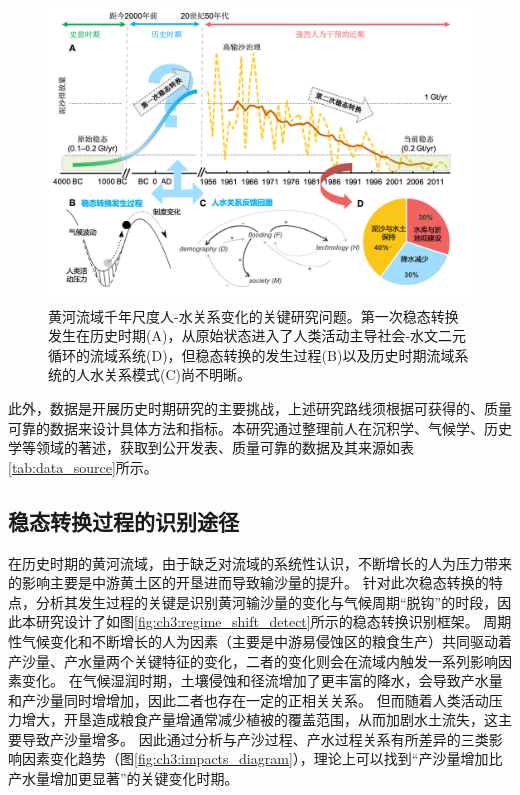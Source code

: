 \begin{figure}[!htb] %
    \centering
    \includegraphics[width=\textwidth]{img/ch3/ch3_why_regime_shift.png}
    \caption[黄河流域千年尺度人-水关系变化的关键研究问题]{黄河流域千年尺度人-水关系变化的关键研究问题。第一次稳态转换发生在历史时期(A)，从原始状态进入了人类活动主导社会-水文二元循环的流域系统(D)，但稳态转换的发生过程(B)以及历史时期流域系统的人水关系模式(C)尚不明晰。}
    \label{fig:ch3:why_regime_shift}
\end{figure}

此外，数据是开展历史时期研究的主要挑战，上述研究路线须根据可获得的、质量可靠的数据来设计具体方法和指标。本研究通过整理前人在沉积学、气候学、历史学等领域的著述，获取到公开发表、质量可靠的数据及其来源如表\ref{tab:data_source}所示。




\subsection{稳态转换过程的识别途径}
\label{sec:ch3:approach}

在历史时期的黄河流域，由于缺乏对流域的系统性认识，不断增长的人为压力带来的影响主要是中游黄土区的开垦进而导致输沙量的提升\cite{wu2020a}。
针对此次稳态转换的特点，分析其发生过程的关键是识别黄河输沙量的变化与气候周期“脱钩”的时段，因此本研究设计了如图\ref{fig:ch3:regime_shift_detect}所示的稳态转换识别框架。
周期性气候变化和不断增长的人为因素（主要是中游易侵蚀区的粮食生产）共同驱动着产沙量、产水量两个关键特征的变化，二者的变化则会在流域内触发一系列影响因素变化。
在气候湿润时期，土壤侵蚀和径流增加了更丰富的降水，会导致产水量和产沙量同时增增加，因此二者也存在一定的正相关关系。
但而随着人类活动压力增大，开垦造成粮食产量增通常减少植被的覆盖范围，从而加剧水土流失，这主要导致产沙量增多。
因此通过分析与产沙过程、产水过程关系有所差异的三类影响因素变化趋势（图\ref{fig:ch3:impacts_diagram}），理论上可以找到“产沙量增加比产水量增加更显著”的关键变化时期。


